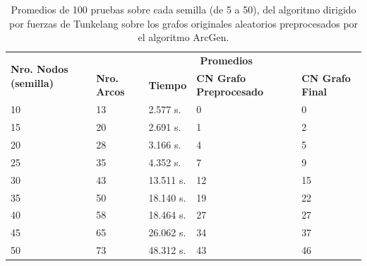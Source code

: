 \begin{table}
	\caption{Promedios de 100 pruebas sobre cada semilla (de 5 a 50), del algoritmo dirigido por fuerzas de Tunkelang sobre los grafos originales aleatorios preprocesados por el algoritmo ArcGen.}
	\label{tab:resultados_gen_alg_fue}
	\begin{tabularx}{\linewidth}{|p{1.5cm}|p{1.2cm}|p{1.5cm}|X|X|}
		\hline
		\multirow{2}{2cm}{\textbf{Nro. Nodos (semilla)}} & \multicolumn{4}{c|}{\textbf{Promedios}} \\
		\cline{2-5}
		& \textbf{Nro. Arcos} & \textbf{Tiempo} & \textbf{CN Grafo Preprocesado} & \textbf{CN Grafo Final} \\
		\hline
		10 & 13 & 2.577 s. & 0 & 0 \\
		\hline
		15 & 20 & 2.691 s. & 1 & 2 \\
		\hline
		20 & 28 & 3.166 s. & 4 & 5 \\
		\hline
		25 & 35 & 4.352 s. & 7 & 9 \\
		\hline
		30 & 43 & 13.511 s. & 12 & 15 \\
		\hline
		35 & 50 & 18.140 s. & 19 & 22 \\
		\hline
		40 & 58 & 18.464 s. & 27 & 27 \\
		\hline
		45 & 65 & 26.062 s. & 34 & 37 \\
		\hline
		50 & 73 & 48.312 s. & 43 & 46 \\
		\hline
	\end{tabularx}
\end{table}



